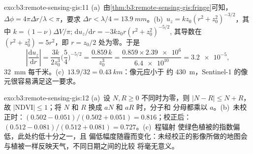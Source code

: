 \begin{solution}{exo:b3:remote-sensing-gis:11}
(a)~由\cref{thm:b3:remote-sensing-gis:fringe}可知，$\Delta\phi =
4\pi\Delta r/\lambda < \pi$，要求 $\Delta r < \lambda/4 =
\qty{13.9}{mm}$。(b)~$u_z = k z_0(r^2 + z_0^2)^{-3/2}$，其中 $k = (1 -
\nu)\Delta V/\pi$; $\mathrm du_z/\mathrm dr = -3kz_0r(r^2 + z_0^2)^{-5/2}$,
其导数在 $(r^2 + z_0^2) = 5r^2$，即 $r = z_0/2$ 处为零。于是
\[
\left|\frac{\mathrm du_z}{\mathrm dr}\right| = \frac{3k}{2z_0^3}\Big(\frac54\Big)^{-5/2}
= \frac{0.859\,k}{z_0^3} = \frac{0.859\times\num{2.39e6}}{\num{6.4e10}} = \num{3.2e-5},
\]
\qty{32}{mm} 每千米。(c)~$13.9/32 = \qty{0.43}{km}$：像元应小于
约 \qty{430}{m}，Sentinel-1 的像元很容易满足这一要求。
\end{solution}

\begin{solution}{exo:b3:remote-sensing-gis:12}
(a)~设 $N, R \ge 0$ 不同时为零，则 $|N - R| \le N + R$，故 $|\mathrm{NDVI}|
\le 1$；将 $N$ 和 $R$ 换成 $aN$ 和 $aR$ 时，分子和
分母都乘以 $a$。(b)~未校正时：$(0.502 - 0.051)/(0.502 + 0.051) =
0.816$；校正后：$(0.512 - 0.081)/(0.512 + 0.081) = 0.727$。(c)~程辐射
使绿色植被的指数偏低，此处约低十分之一，且
偏低幅度随霾而变化：未经校正的影像所做的地图会
与植被一样反映天气，不同日期之间的比较
将毫无意义。
\end{solution}

